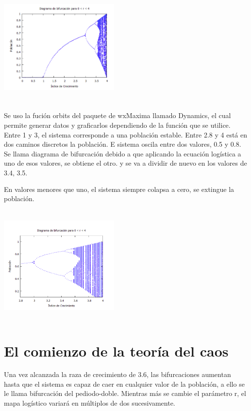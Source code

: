 \documentclass{article}
\begin{document}
\begin{center}
\includegraphics[width=6cm, height=6cm]{Im2.png}
\end{center}

Se uso la fución orbits del paquete de wxMaxima llamado Dynamics, el cual permite generar datos y graficarlos dependiendo de la función que se utilice. Entre 1 y 3, el sistema corresponde a una población estable. Entre 2.8 y 4 está en dos caminos discretos la población. E sistema oscila entre dos valores, 0.5 y 0.8. Se llama diagrama de bifurcación debido a que  aplicando la ecuación logística a uno de esos valores, se obtiene el otro.  y se va a dividir de nuevo en los valores de 3.4, 3.5.

En valores menores que uno, el sistema siempre colapsa a cero, se extingue la población. 
\begin{center}
\includegraphics[width=6cm, height=6cm]{Im3.png}
\end{center}






\section{El comienzo de la teoría del caos}

Una vez alcanzada la raza de crecimiento de 3.6, las bifurcaciones aumentan hasta que el sistema es capaz de caer en cualquier valor de la población, a ello se le llama bifurcación del pediodo-doble. Mientras más se cambie el parámetro r, el mapa logístico variará en múltiplos de dos sucesivamente.
\end{document}
